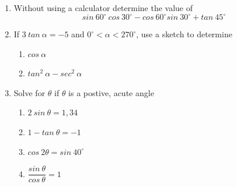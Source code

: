 \begin{eocexercises}{}

\begin{enumerate}[noitemsep, label=\textbf{\arabic*}. ] 
\item Without using a calculator determine the value of 
\begin{equation*}
sin~60^{\circ}~cos~30^{\circ}-cos~60^{\circ}sin~30^{\circ} + tan~45^{\circ}
\end{equation*}
\item If $3~tan~\alpha = -5$ and $0^{\circ} < \alpha < 270^{\circ}$, use a sketch to determine
    \begin{enumerate}[noitemsep, label=\textbf{\alph*}. ] 
    \item $cos~\alpha$
    \item $tan^{2}~\alpha - sec^{2}~\alpha$
    \end{enumerate}
\item Solve for $\theta$ if $\theta$ is a postive, acute angle
    \begin{enumerate}[noitemsep, label=\textbf{\alph*}. ] 
    \item $2~sin~\theta = 1,34$
    \item $1 - tan~\theta = -1$
    \item $cos~2\theta = sin~40^{\circ}$ \vspace{3pt}
    \item $\dfrac{sin~\theta}{cos~\theta}= 1$
    \end{enumerate}



\end{enumerate}
\end{eocexercises}
